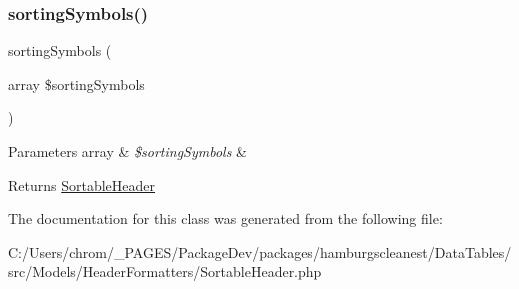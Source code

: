 \subsubsection{\texorpdfstring{sorting\+Symbols()}{sortingSymbols()}}
{\footnotesize\ttfamily sorting\+Symbols (\begin{DoxyParamCaption}\item[{array}]{\$sorting\+Symbols }\end{DoxyParamCaption})}


\begin{DoxyParams}[1]{Parameters}
array & {\em \$sorting\+Symbols} & \\
\hline
\end{DoxyParams}
\begin{DoxyReturn}{Returns}
\hyperlink{classhamburgscleanest_1_1_data_tables_1_1_models_1_1_header_formatters_1_1_sortable_header}{Sortable\+Header} 
\end{DoxyReturn}


The documentation for this class was generated from the following file\+:\begin{DoxyCompactItemize}
\item 
C\+:/\+Users/chrom/\+\_\+\+P\+A\+G\+E\+S/\+Package\+Dev/packages/hamburgscleanest/\+Data\+Tables/src/\+Models/\+Header\+Formatters/Sortable\+Header.\+php\end{DoxyCompactItemize}
